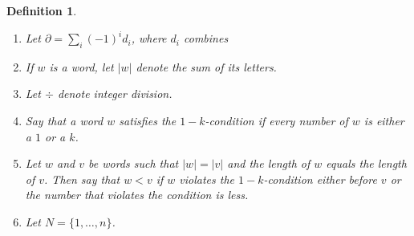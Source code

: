\documentclass{amsart}
\newtheorem{definition}[theorem]{Definition}
\begin{document}
  \begin{definition} 
     \begin{enumerate}
        \item Let $\partial = \sum_i (-1)^i d_i$, where $d_i$ combines 
        \item If $w$ is a word, let $|w|$ denote the sum of its letters.
        \item Let $\div$ denote integer division.
        \item Say that a word $w$ satisfies the $1-k$-condition if every number of $w$ is either a $1$ or a $k$.
        \item Let $w$ and $v$ be words such that $|w| = |v|$ and the length of $w$ equals the length of $v$. Then say
              that $w < v$ if $w$ violates the $1-k$-condition either before $v$ or the number that violates the condition
              is less. 
        \item Let $N = \{1, \ldots, n \}$.
     \end{enumerate}
  \end{definition}
\end{document}

